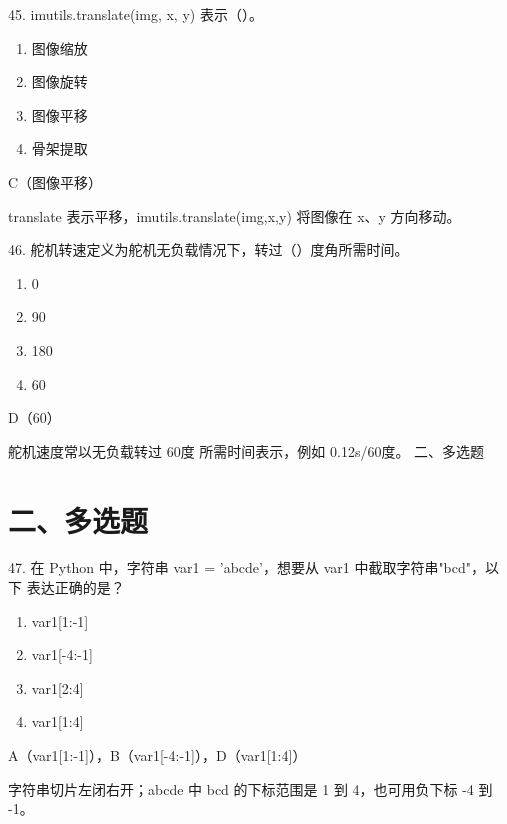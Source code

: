 \begin{question}{45. imutils.translate(img, x, y) 表示（）。}
\begin{enumerate}[label=\Alph*., leftmargin=2.4em, itemsep=0.2em]
\item 图像缩放
\item 图像旋转
\item 图像平移
\item 骨架提取
\end{enumerate}
\end{question}
\begin{answer}
C（图像平移）
\end{answer}
\begin{explanation}
translate 表示平移，imutils.translate(img,x,y) 将图像在 x、y 方向移动。
\end{explanation}

\begin{question}{46. 舵机转速定义为舵机无负载情况下，转过（）度角所需时间。}
\begin{enumerate}[label=\Alph*., leftmargin=2.4em, itemsep=0.2em]
\item 0
\item 90
\item 180
\item 60
\end{enumerate}
\end{question}
\begin{answer}
D（60）
\end{answer}
\begin{explanation}
舵机速度常以无负载转过 60度 所需时间表示，例如 0.12s/60度。 二、多选题
\end{explanation}

\section{二、多选题}

\begin{question}{47. 在 Python 中，字符串 var1 = 'abcde'，想要从 var1 中截取字符串"bcd"，以下 表达正确的是？}
\begin{enumerate}[label=\Alph*., leftmargin=2.4em, itemsep=0.2em]
\item var1[1:-1]
\item var1[-4:-1]
\item var1[2:4]
\item var1[1:4]
\end{enumerate}
\end{question}
\begin{answer}
A（var1[1:-1]），B（var1[-4:-1]），D（var1[1:4]）
\end{answer}
\begin{explanation}
字符串切片左闭右开；abcde 中 bcd 的下标范围是 1 到 4，也可用负下标 -4 到 -1。
\end{explanation}

